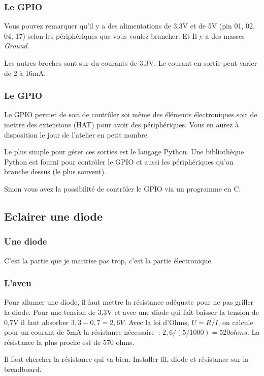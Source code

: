 \begin{frame}[containsverbatim]
\frametitle{Le GPIO}

Vous pouvez remarquer qu'il y a des alimentations de 3,3V et de 5V (pin 01, 02, 04, 17) selon les périphériques que vous voulez brancher. Et Il y a des masses \emph{Ground}.

Les autres broches sont sur du courants de 3,3V. Le courant en sortie peut varier de 2 à 16mA. 

\end{frame}

\begin{frame}[containsverbatim]
\frametitle{Le GPIO}

Le GPIO permet de soit de contrôler soi même des éléments électroniques soit de mettre des extensions (HAT) pour avoir des périphériques. Vous en aurez à disposition le jour de l'atelier en petit nombre.

Le plus simple pour gérer ces sorties est le langage Python. Une bibliothèque Python est fourni pour contrôler le GPIO et aussi les périphériques qu'on branche dessus (le plus souvent).

Sinon vous avez la possibilité de contrôler le GPIO via un programme en C.

\end{frame}

\subsection{Eclairer une diode}

\begin{frame}[containsverbatim]
\frametitle{Une diode}

C'est la partie que je maitrise pas trop, c'est la partie électronique.

\end{frame}

\begin{frame}[containsverbatim]
\frametitle{L'aveu}

Pour allumer une diode, il faut mettre la résistance adéquate pour ne pas griller la diode. Pour une tension de 3,3V et avec une diode qui fait baisser la tension de 0,7V il faut absorber $3,3-0,7=2,6V$. Avec la loi d'Ohms, $U=R/I$, on calcule pour un courant de 5mA la résistance nécessaire~: $2,6/(5/1000)=520 ohms$. La résistance la plus proche est de 570 ohms. 

Il faut chercher la résistance qui va bien. Installer fil, diode et résistance sur la breadboard.

\end{frame}

